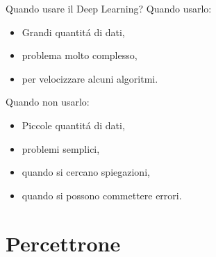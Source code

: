 \documentclass{beamer}
\begin{document}
\begin{frame}{Quando usare il Deep Learning?}
    Quando usarlo:
    \begin{itemize}
        \item  Grandi quantit\'a di dati,
        \item  problema molto complesso,
        \item  per velocizzare alcuni algoritmi.
    \end{itemize}
    \pause
    Quando non usarlo:
    \begin{itemize}
        \item  Piccole quantit\'a di dati,
        \item  problemi semplici,
        \item  quando si cercano spiegazioni,
        \item  quando si possono commettere errori. 
    \end{itemize}
\end{frame}

\section{Percettrone}
\end{document}
